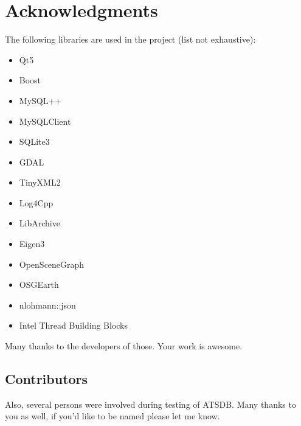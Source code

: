  \section{Acknowledgments}

The following libraries are used in the project (list not exhaustive):

\begin{itemize}  
\item Qt5
\item Boost
\item MySQL++
\item MySQLClient
\item SQLite3
\item GDAL
\item TinyXML2
\item Log4Cpp
\item LibArchive
\item Eigen3
\item OpenSceneGraph
\item OSGEarth
\item nlohmann::json
\item Intel Thread Building Blocks
\end{itemize}

Many thanks to the developers of those. Your work is awesome.

\subsection{Contributors}

Also, several persons were involved during testing of ATSDB. Many thanks to you as well, if you'd like to be named please let me know.
